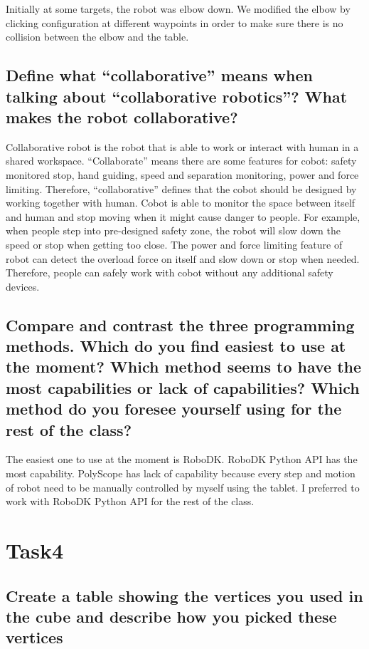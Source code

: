 \documentclass[letterpaper,11pt]{texMemo} %
\begin{document}
Initially at some targets, the robot was elbow down. We modified the elbow by clicking configuration at different waypoints in order to make sure there is no collision between the elbow and the table.


\subsection{Define what “collaborative” means when talking about “collaborative robotics”? What makes the robot collaborative?}

Collaborative robot is the robot that is able to work or interact with human in a shared workspace. “Collaborate” means there are some features for cobot: safety monitored stop, hand guiding, speed and separation monitoring, power and force limiting. Therefore, “collaborative” defines that the cobot should be designed by working
together with human. Cobot is able to monitor the space between itself and human and stop moving when it might cause danger to people. For example, when people step into pre-designed safety zone, the robot will slow down the speed or stop when getting too
close. The power and force limiting feature of robot can detect the overload force on itself and slow down or stop when needed. Therefore, people can safely work with cobot without any additional safety devices.

\subsection{Compare and contrast the three programming methods. Which do you find easiest to use at the moment? Which method seems to have the most capabilities or lack of capabilities? Which method do you foresee yourself using for the rest of the class?}

The easiest one to use at the moment is RoboDK. RoboDK Python API has the most capability. PolyScope has lack of capability because every step and motion of robot need to be manually controlled by myself using the tablet. I preferred to work with RoboDK Python API for the rest of the class.


\section{Task4}

\subsection{Create a table showing the vertices you used in the cube and describe how you picked	these vertices}
\end{document}
